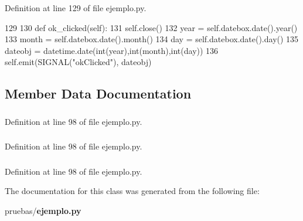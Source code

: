 \-Definition at line 129 of file ejemplo.\-py.


\begin{DoxyCode}
129 
130     def ok_clicked(self):
131         self.close()
132         year = self.datebox.date().year()
133         month = self.datebox.date().month()
134         day = self.datebox.date().day()
135         dateobj = datetime.date(int(year),int(month),int(day))
136         self.emit(SIGNAL("okClicked"), dateobj)

\end{DoxyCode}


\subsection{\-Member \-Data \-Documentation}
\subsubsection[{button\-\_\-ok}]{}\label{classpruebas_1_1ejemplo_1_1_start_window_a342f62dd43765977c85c60a9d2daf14b}


\-Definition at line 98 of file ejemplo.\-py.

\subsubsection[{datebox}]{}\label{classpruebas_1_1ejemplo_1_1_start_window_a0fb72a48582156c7362baa9d37f94f58}


\-Definition at line 98 of file ejemplo.\-py.

\subsubsection[{label\-\_\-date}]{}\label{classpruebas_1_1ejemplo_1_1_start_window_a45fed6596c3f2d33b1a7eb2c408dc198}


\-Definition at line 98 of file ejemplo.\-py.



\-The documentation for this class was generated from the following file\-:\begin{DoxyCompactItemize}
\item 
pruebas/{\bf ejemplo.\-py}\end{DoxyCompactItemize}
